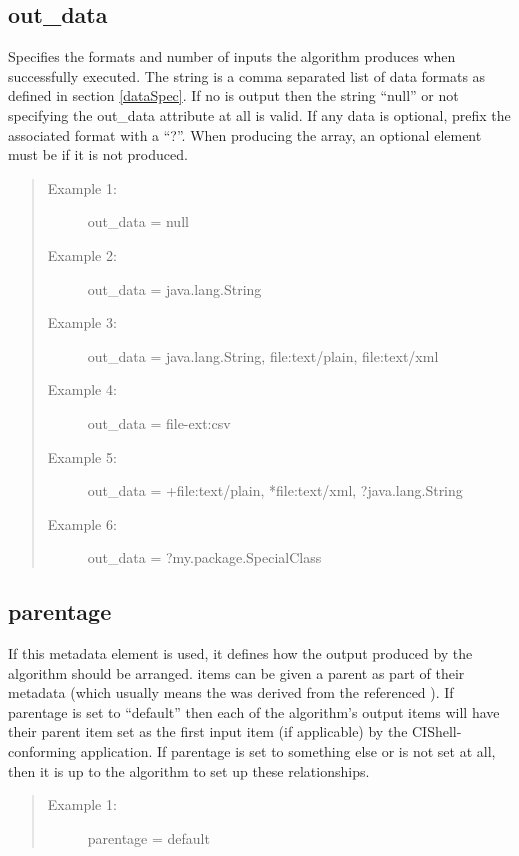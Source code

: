 \subsection*{out\_data} 
Specifies the formats and number of  inputs
the algorithm produces when successfully executed. The string is a comma
separated list of data formats as defined in section \ref{dataSpec}. If no
 is output then the string ``null'' or not specifying the out\_data
attribute at all is valid. If any data is optional, prefix the associated
format with a ``?''. When producing the  array, an optional
 element must be  if it is not produced. 

\begin{quote}
\begin{description}
  \item[Example 1:] out\_data = null
  \item[Example 2:] out\_data = java.lang.String
  \item[Example 3:] out\_data = java.lang.String, file:text/plain, file:text/xml
  \item[Example 4:] out\_data = file-ext:csv
  \item[Example 5:] out\_data = +file:text/plain, *file:text/xml,
  ?java.lang.String
  \item[Example 6:] out\_data = ?my.package.SpecialClass
\end{description}
\end{quote}


\subsection*{parentage}
If this metadata element is used, it defines how the output  produced
by the algorithm should be arranged.  items can be given a parent as
part of their metadata (which usually means the  was derived from the
referenced ). If parentage is set to ``default'' then each of the
algorithm's output  items will have their parent  item
set as the first input  item (if applicable) by the
CIShell-conforming application. If parentage is set to something else or is not
set at all, then it is up to the algorithm to set up these relationships.

\begin{quote}
\begin{description}
  \item[Example 1:] parentage = default 
\end{description}
\end{quote}


